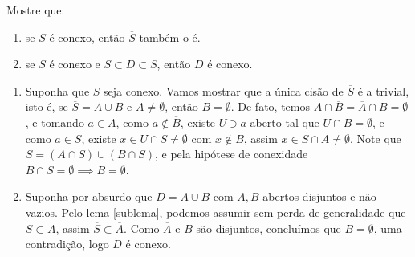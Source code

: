 \begin{Mybox}
Mostre que:
\begin{enumerate}[label=\color{blue}\normalfont\textbf{(\alph*)}]
\item se $S$ é conexo, então $\overline{S}$ também o é.
\item se $S$ é conexo e $S \subset D \subset \overline{S}$, então $D$ é conexo.
\end{enumerate}
\vspace{-.4cm}
\end{Mybox}
\vspace{-.5cm}
\begin{dem}
\begin{enumerate}[label=\color{blue}\normalfont\textbf{(\alph*)}]
\item Suponha que $S$ seja conexo. Vamos mostrar que a única cisão de $\overline{S}$ é a trivial, isto é, se $\overline{S} = A \cup B$ e $A \neq \emptyset$, então $B = \emptyset$. De fato, temos $A \cap \overline{B} =  \overline{A} \cap B = \emptyset$, e tomando $a \in A$, como $a \notin \overline{B}$, existe $U \ni a$ aberto tal que $U \cap B = \emptyset$, e como $a \in \overline{S}$, existe $x \in U \cap S \neq \emptyset$ com $x \notin B$, assim $x \in S  \cap A \neq \emptyset$. Note que $S = (A \cap S) \cup (B \cap S)$, e pela hipótese de conexidade $B \cap S = \emptyset \implies B = \emptyset$.
\item Suponha por absurdo que $D = A \cup B$ com $A, B$ abertos disjuntos e não vazios. Pelo lema \cref{sublema}, podemos assumir sem perda de generalidade que $S \subset A$, assim $\overline{S} \subset \overline{A}$. Como $\overline{A}$ e $B$ são disjuntos, concluímos que $B = \emptyset$, uma contradição, logo $D$ é conexo.
\end{enumerate}
\end{dem}


